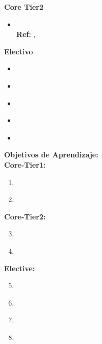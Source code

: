 \noindent \textbf{Core Tier2}
\begin{itemize}
	\item \SPSustainabilityTopicEnvironmental\xspace \\ \textbf{Ref:} , \label{sec:BOK:SPSustainabilityTopicEnvironmental}
\end{itemize}

\noindent \textbf{Electivo}
\begin{itemize}
	\item \SPSustainabilityTopicGuidelines\label{sec:BOK:SPSustainabilityTopicGuidelines}
	\item \SPSustainabilityTopicSystemic\label{sec:BOK:SPSustainabilityTopicSystemic}
	\item \SPSustainabilityTopicPervasive\label{sec:BOK:SPSustainabilityTopicPervasive}
	\item \SPSustainabilityTopicResearch\label{sec:BOK:SPSustainabilityTopicResearch}
	\item \SPSustainabilityTopicThe\label{sec:BOK:SPSustainabilityTopicThe}
\end{itemize}


\noindent \textbf{Objetivos de Aprendizaje:}\\
\noindent \textbf{Core-Tier1:}
\begin{enumerate}
	\setcounter{enumi}{0}
	\item \SPSustainabilityLOIdentifyWaysA\xspace[\SPSustainabilityLOIdentifyWaysALevel]\label{sec:BOK:SPSustainabilityLOIdentifyWaysA}
	\item \SPSustainabilityLOIllustrateGlobal\xspace[\SPSustainabilityLOIllustrateGlobalLevel]\label{sec:BOK:SPSustainabilityLOIllustrateGlobal}
\end{enumerate}
\noindent \textbf{Core-Tier2:}
\begin{enumerate}
	\setcounter{enumi}{2}
	\item \SPSustainabilityLODescribeTheOfWithin\xspace[\SPSustainabilityLODescribeTheOfWithinLevel]\label{sec:BOK:SPSustainabilityLODescribeTheOfWithin}
	\item \SPSustainabilityLOInvestigateTheEnvironmental\xspace[\SPSustainabilityLOInvestigateTheEnvironmentalLevel]\label{sec:BOK:SPSustainabilityLOInvestigateTheEnvironmental}
\end{enumerate}
\noindent \textbf{Elective:}
\begin{enumerate}
	\setcounter{enumi}{4}
	\item \SPSustainabilityLOIdentifyGuidelines\xspace[\SPSustainabilityLOIdentifyGuidelinesLevel]\label{sec:BOK:SPSustainabilityLOIdentifyGuidelines}
	\item \SPSustainabilityLOListTheOfWeb\xspace[\SPSustainabilityLOListTheOfWebLevel]\label{sec:BOK:SPSustainabilityLOListTheOfWeb}
	\item \SPSustainabilityLOInvestigatePervasive\xspace[\SPSustainabilityLOInvestigatePervasiveLevel]\label{sec:BOK:SPSustainabilityLOInvestigatePervasive}
	\item \SPSustainabilityLODevelopApplications\xspace[\SPSustainabilityLODevelopApplicationsLevel]\label{sec:BOK:SPSustainabilityLODevelopApplications}
\end{enumerate}


